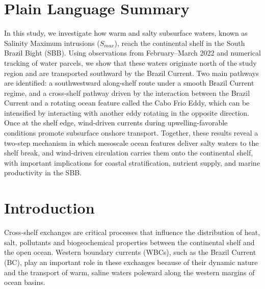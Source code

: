 \documentclass[draft]{agujournal2019}
\begin{document}
\section*{Plain Language Summary}
In this study, we investigate how warm and salty subsurface waters, known as Salinity Maximum intrusions (\textit{$S_{max}$}), reach the continental shelf in the South Brazil Bight (SBB). Using observations from February–March 2022 and numerical tracking of water parcels, we show that these waters originate north of the study region and are transported southward by the Brazil Current. Two main pathways are identified: a southwestward along-shelf route under a smooth Brazil Current regime, and a cross-shelf pathway driven by the interaction between the Brazil Current and a rotating ocean feature called the Cabo Frio Eddy, which can be intensified by interacting with another eddy rotating in the opposite direction. Once at the shelf edge, wind-driven currents during upwelling-favorable conditions promote subsurface onshore transport. Together, these results reveal a two-step mechanism in which mesoscale ocean features deliver salty waters to the shelf break, and wind-driven circulation carries them onto the continental shelf, with important implications for coastal stratification, nutrient supply, and marine productivity in the SBB.

%
%

\section{Introduction}
\label{sec:introduction}

Cross-shelf exchanges are critical processes that influence the distribution of heat, salt, pollutants \cite{brink2016} and biogeochemical properties \cite{liu2010carbon,cossarini2015continental} between the continental shelf and the open ocean. Western boundary currents (WBCs), such as the Brazil Current (BC), play an important role in these exchanges because of their dynamic nature and the transport of warm, saline waters poleward along the western margins of ocean basins. 
\end{document}

